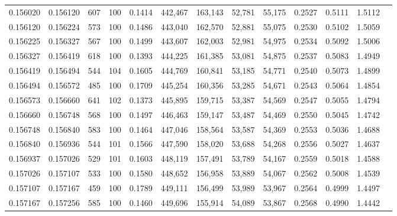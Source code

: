 \begin{tabular}{rrrrrrrrrrrrr}
0.156020 & 0.156120 &   607 & 100 &                                     0.1414 & 442,467 & 163,143 &  52,781 &  55,175 & 0.2527 & 0.5111 & 1.5112 \\
0.156120 & 0.156224 &   573 & 100 &                                     0.1486 & 443,040 & 162,570 &  52,881 &  55,075 & 0.2530 & 0.5102 & 1.5059 \\
0.156225 & 0.156327 &   567 & 100 &                                     0.1499 & 443,607 & 162,003 &  52,981 &  54,975 & 0.2534 & 0.5092 & 1.5006 \\
0.156327 & 0.156419 &   618 & 100 &                                     0.1393 & 444,225 & 161,385 &  53,081 &  54,875 & 0.2537 & 0.5083 & 1.4949 \\
0.156419 & 0.156494 &   544 & 104 &                                     0.1605 & 444,769 & 160,841 &  53,185 &  54,771 & 0.2540 & 0.5073 & 1.4899 \\
0.156494 & 0.156572 &   485 & 100 &                                     0.1709 & 445,254 & 160,356 &  53,285 &  54,671 & 0.2543 & 0.5064 & 1.4854 \\
0.156573 & 0.156660 &   641 & 102 &                                     0.1373 & 445,895 & 159,715 &  53,387 &  54,569 & 0.2547 & 0.5055 & 1.4794 \\
0.156660 & 0.156748 &   568 & 100 &                                     0.1497 & 446,463 & 159,147 &  53,487 &  54,469 & 0.2550 & 0.5045 & 1.4742 \\
0.156748 & 0.156840 &   583 & 100 &                                     0.1464 & 447,046 & 158,564 &  53,587 &  54,369 & 0.2553 & 0.5036 & 1.4688 \\
0.156840 & 0.156936 &   544 & 101 &                                     0.1566 & 447,590 & 158,020 &  53,688 &  54,268 & 0.2556 & 0.5027 & 1.4637 \\
0.156937 & 0.157026 &   529 & 101 &                                     0.1603 & 448,119 & 157,491 &  53,789 &  54,167 & 0.2559 & 0.5018 & 1.4588 \\
0.157026 & 0.157107 &   533 & 100 &                                     0.1580 & 448,652 & 156,958 &  53,889 &  54,067 & 0.2562 & 0.5008 & 1.4539 \\
0.157107 & 0.157167 &   459 & 100 &                                     0.1789 & 449,111 & 156,499 &  53,989 &  53,967 & 0.2564 & 0.4999 & 1.4497 \\
0.157167 & 0.157256 &   585 & 100 &                                     0.1460 & 449,696 & 155,914 &  54,089 &  53,867 & 0.2568 & 0.4990 & 1.4442 \\

\end{tabular}
